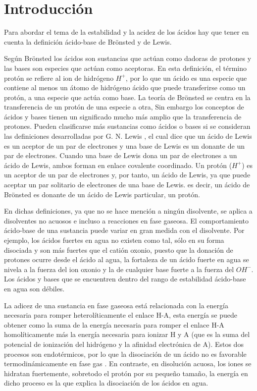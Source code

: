 \chapter{Introducción}

Para abordar el tema de la estabilidad y la acidez de los ácidos hay que tener en cuenta la definición ácido-base de Brönsted y de Lewis. \cite{quimica1}

Según Brönsted  \cite{quimica7} los ácidos son sustancias que actúan como dadoras de protones y las bases son especies que actúan como aceptoras. En esta definición, el término protón se refiere al ion de hidrógeno $H^+$, por lo que un ácido es una especie que contiene al menos un átomo de hidrógeno ácido que puede transferirse como un protón, a una especie que actúa como base. La teoría de Brönsted se centra en la transferencia de un protón de una especie a otra, Sin embargo los conceptos de ácidos y bases tienen un significado mucho más amplio que la transferencia de protones. Pueden clasificarse más sustancias como ácidos o bases si se consideran las definiciones desarrolladas por G. N. Lewis \cite{quimica7}, el cual dice que un ácido de Lewis es un aceptor de un par de electrones y una base de Lewis es un donante de un par de electrones. Cuando una base de Lewis dona un par de electrones a un ácido de Lewis, ambos forman en enlace covalente coordinado. Un protón ($H^+$) es un aceptor de un par de electrones y, por tanto, un ácido de Lewis, ya que puede aceptar un par solitario de electrones de una base de Lewis. es decir, un ácido de Brönsted es donante de un ácido de Lewis particular, un protón.

En dichas definiciones, ya que no se hace mención a ningún disolvente, se aplica a disolventes no acuosos e incluso a reacciones en fase gaseosa. El comportamiento ácido-base de una sustancia puede variar en gran medida con el disolvente. Por ejemplo, los ácidos fuertes en agua no existen como tal, sólo en su forma disociada y son más fuertes que el catión oxonio, puesto que la donación de protones ocurre desde el ácido al agua, la fortaleza de un ácido fuerte en agua se nivela a la fuerza del ion oxonio y la de cualquier base fuerte a la fuerza del $OH ^-$. Los ácidos y bases que se encuentren dentro del rango de estabilidad ácido-base en agua son débiles.

La adicez de una sustancia en fase gaseosa está relacionada con la energía necesaria para romper heterolíticamente el enlace H-A, esta energía se puede obtener como la suma de la energía necesaria para romper el enlace H-A homolíticamente más la energía necesaria para ionizar H y A (que es la suma del potencial de ionización del hidrógeno y la afinidad electrónica de A). Estos dos procesos son endotérmicos, por lo que la disociación de un ácido no es favorable termodinámicamente en fase gas \cite {quimica1}. En contraste, en disolución acuosa, los iones se hidratan fuertemente, sobretodo el protón por su pequeño tamaño, la energía en dicho proceso es la que explica la disociación de los ácidos en agua.

